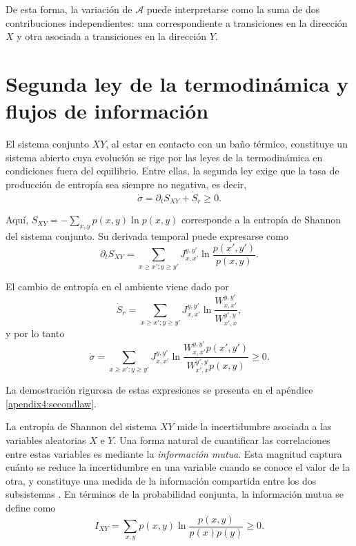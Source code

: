 De esta forma, la variación de \(\mathcal{A}\) puede interpretarse como la suma de dos contribuciones independientes: una correspondiente a transiciones en la dirección \(X\) y otra asociada a transiciones en la dirección \(Y\).

\label{sec4:flujos}
\section{Segunda ley de la termodinámica y flujos de información}

El sistema conjunto \(XY\), al estar en contacto con un baño térmico, constituye un sistema abierto cuya evolución se rige por las leyes de la termodinámica en condiciones fuera del equilibrio. Entre ellas, la segunda ley exige que la tasa de producción de entropía sea siempre no negativa, es decir,
\begin{equation*}
    \dot{\sigma} = \partial_{t}S_{XY} + \dot{S}_{r} \geq 0. 
\end{equation*}

Aquí, \( S_{XY} = - \sum_{x,y} p(x,y) \ln p(x,y) \) corresponde a la entropía de Shannon del sistema conjunto. Su derivada temporal puede expresarse como
\begin{equation*}
    \partial_{t}S_{XY} = \sum_{x\geq x'; y\geq y'} J_{x,x'}^{y,y'} \ln \frac{p(x',y')}{p(x,y)}.
\end{equation*}

El cambio de entropía en el ambiente viene dado por
\begin{equation*}
    \dot{S}_{r} = \sum_{x\geq x'; y\geq y'} J_{x,x'}^{y,y'} \ln \frac{W_{x,x'}^{y,y'}}{W_{x',x}^{y',y}},
\end{equation*}
y por lo tanto
\begin{equation*}
    \dot{\sigma} = \sum_{x\geq x'; y\geq y'} J_{x,x'}^{y,y'} \ln \frac{ W_{x,x'}^{y,y'}p(x',y')  }{ W_{x',x}^{y',y}p(x,y) } \geq 0.
\end{equation*}

La demostración rigurosa de estas expresiones se presenta en el apéndice \ref{apendix4:secondlaw}.  

La entropía de Shannon del sistema \( XY \) mide la incertidumbre asociada a las variables aleatorias \( X \) e \( Y \). Una forma natural de cuantificar las correlaciones entre estas variables es mediante la \textit{información mutua}. Esta magnitud captura cuánto se reduce la incertidumbre en una variable cuando se conoce el valor de la otra, y constituye una medida de la información compartida entre los dos subsistemas \cite{parrondo2015thermodynamics,cover1999elements}. En términos de la probabilidad conjunta, la información mutua se define como
\begin{equation*}
    I_{XY} = \sum_{x,y} p(x,y) \ln \frac{p(x,y)}{p(x)p(y)} \geq 0. 
\end{equation*}

